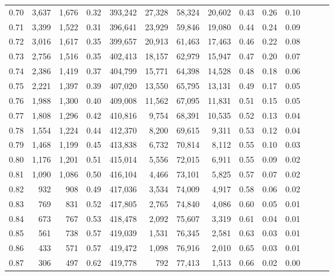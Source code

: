 \begin{tabular}{rrrrrrrrrrrrrr}
0.70 &   3,637 &  1,676 &  0.32 &  393,242 &   27,328 &  58,324 &  20,602 &  0.43 &  0.26 &      0.10 \\
0.71 &   3,399 &  1,522 &  0.31 &  396,641 &   23,929 &  59,846 &  19,080 &  0.44 &  0.24 &      0.09 \\
0.72 &   3,016 &  1,617 &  0.35 &  399,657 &   20,913 &  61,463 &  17,463 &  0.46 &  0.22 &      0.08 \\
0.73 &   2,756 &  1,516 &  0.35 &  402,413 &   18,157 &  62,979 &  15,947 &  0.47 &  0.20 &      0.07 \\
0.74 &   2,386 &  1,419 &  0.37 &  404,799 &   15,771 &  64,398 &  14,528 &  0.48 &  0.18 &      0.06 \\
0.75 &   2,221 &  1,397 &  0.39 &  407,020 &   13,550 &  65,795 &  13,131 &  0.49 &  0.17 &      0.05 \\
0.76 &   1,988 &  1,300 &  0.40 &  409,008 &   11,562 &  67,095 &  11,831 &  0.51 &  0.15 &      0.05 \\
0.77 &   1,808 &  1,296 &  0.42 &  410,816 &    9,754 &  68,391 &  10,535 &  0.52 &  0.13 &      0.04 \\
0.78 &   1,554 &  1,224 &  0.44 &  412,370 &    8,200 &  69,615 &   9,311 &  0.53 &  0.12 &      0.04 \\
0.79 &   1,468 &  1,199 &  0.45 &  413,838 &    6,732 &  70,814 &   8,112 &  0.55 &  0.10 &      0.03 \\
0.80 &   1,176 &  1,201 &  0.51 &  415,014 &    5,556 &  72,015 &   6,911 &  0.55 &  0.09 &      0.02 \\
0.81 &   1,090 &  1,086 &  0.50 &  416,104 &    4,466 &  73,101 &   5,825 &  0.57 &  0.07 &      0.02 \\
0.82 &     932 &    908 &  0.49 &  417,036 &    3,534 &  74,009 &   4,917 &  0.58 &  0.06 &      0.02 \\
0.83 &     769 &    831 &  0.52 &  417,805 &    2,765 &  74,840 &   4,086 &  0.60 &  0.05 &      0.01 \\
0.84 &     673 &    767 &  0.53 &  418,478 &    2,092 &  75,607 &   3,319 &  0.61 &  0.04 &      0.01 \\
0.85 &     561 &    738 &  0.57 &  419,039 &    1,531 &  76,345 &   2,581 &  0.63 &  0.03 &      0.01 \\
0.86 &     433 &    571 &  0.57 &  419,472 &    1,098 &  76,916 &   2,010 &  0.65 &  0.03 &      0.01 \\
0.87 &     306 &    497 &  0.62 &  419,778 &      792 &  77,413 &   1,513 &  0.66 &  0.02 &      0.00 \\

\end{tabular}
